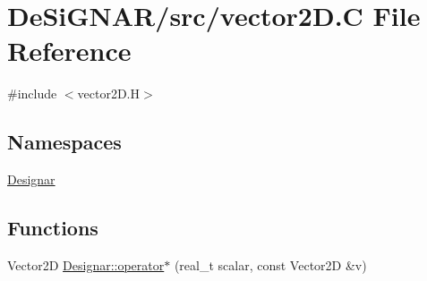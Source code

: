 \hypertarget{vector2_d_8_c}{}\section{De\+Si\+G\+N\+A\+R/src/vector2D.C File Reference}
\label{vector2_d_8_c}
{\ttfamily \#include $<$vector2\+D.\+H$>$}\newline
\subsection*{Namespaces}
\begin{DoxyCompactItemize}
\item 
 \hyperlink{namespace_designar}{Designar}
\end{DoxyCompactItemize}
\subsection*{Functions}
\begin{DoxyCompactItemize}
\item 
Vector2D \hyperlink{namespace_designar_a4b2db2e125d6ac9edf439f63804ba674}{Designar\+::operator$\ast$} (real\+\_\+t scalar, const Vector2D \&v)
\end{DoxyCompactItemize}
